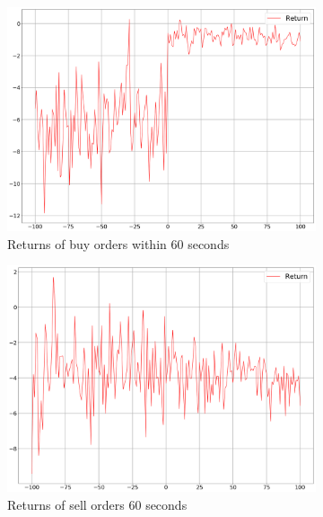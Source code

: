 \begin{figure}[H]
\begin{subfigure}[b]{0.45\textwidth}
        \includegraphics[width=\textwidth]{images/behaviour-up-60s-buy.png}
        \caption{Returns of buy orders within 60 seconds}
        \label{fig:behvaiour-up-60s-buy}
    \end{subfigure}
    \begin{subfigure}[b]{0.45\textwidth}
        \includegraphics[width=\textwidth]{images/behaviour-up-60s-sell.png}
        \caption{Returns of sell orders 60 seconds}
        \label{fig:behvaiour-up-60s-sell}
    \end{subfigure}
    \begin{subfigure}[b]{0.45\textwidth}

\end{subfigure}
\end{figure}
